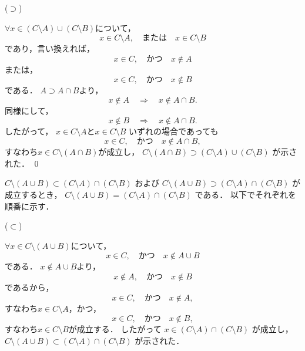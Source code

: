 \documentclass[uplatex,11pt]{jsarticle}
\def\shoumon#1{\vspace{1em}\noindent\ovalbox{\textsf{ #1 }}}
\begin{document}
($\supset$)

$\forall x \in (C \setminus A) \cup (C \setminus B)$について，
\begin{equation*}
	x \in  C \setminus A,
	\quad \text{または} \quad
	x \in C \setminus B
\end{equation*}
であり，言い換えれば，
\begin{equation*}
	x \in  C,
	\quad \text{かつ} \quad
	x \not\in A
\end{equation*}
または，
\begin{equation*}
	x \in  C,
	\quad \text{かつ} \quad
	x \not\in B
\end{equation*}
である．
$A \supset A \cap B$より，
\begin{equation*}
	x \not\in A
	\quad \Longrightarrow \quad
	x \not\in A \cap B.
\end{equation*}
同様にして，
\begin{equation*}
	x \not\in B
	\quad \Longrightarrow \quad
	x \not\in A \cap B.
\end{equation*}
したがって，
$x \in  C \setminus A$と$x \in C \setminus B$
いずれの場合であっても
\begin{equation*}
	x \in  C,
	\quad \text{かつ} \quad
	x \not\in A \cap B,
\end{equation*}
すなわち$x \in C \setminus (A \cap B)$が成立し，
$C \setminus (A \cap B) \supset (C \setminus A) \cup (C \setminus B)$
が示された．
\qed


\shoumon{一般化 De Morgen 律 2}

$C \setminus (A \cup B) \subset (C \setminus A) \cap (C \setminus B)$
および
$C \setminus (A \cup B) \supset (C \setminus A) \cap (C \setminus B)$
が成立するとき，
$C \setminus (A \cup B) = (C \setminus A) \cap (C \setminus B)$
である．
以下でそれぞれを順番に示す．


($\subset$)

$\forall x \in C \setminus (A \cup B)$について，
\begin{equation*}
	x \in  C,
	\quad \text{かつ} \quad
	x \not\in A \cup B
\end{equation*}
である．
$x \not\in A \cup B$より，
\begin{equation*}
	x \not\in A,
	\quad \text{かつ} \quad
	x \not\in B
\end{equation*}
であるから，
\begin{equation*}
	x \in C,
	\quad \text{かつ} \quad
	x \not\in A,
\end{equation*}
すなわち$x \in C \setminus A$，かつ，
\begin{equation*}
	x \in C,
	\quad \text{かつ} \quad
	x \not\in B,
\end{equation*}
すなわち$x \in C \setminus B$が成立する．
したがって
$x \in (C \setminus A) \cap (C \setminus B)$
が成立し，
$C \setminus (A \cup B) \subset (C \setminus A) \cap (C \setminus B)$
が示された．
\end{document}
